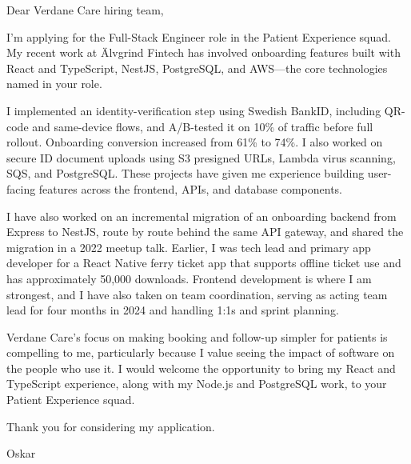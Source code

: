 \documentclass[11pt,a4paper]{article}
\begin{document}
\noindent Dear Verdane Care hiring team,

\vspace{0.8em}

I’m applying for the Full-Stack Engineer role in the Patient Experience squad. My recent work at Älvgrind Fintech has involved onboarding features built with React and TypeScript, NestJS, PostgreSQL, and AWS---the core technologies named in your role.

\vspace{0.8em}

I implemented an identity-verification step using Swedish BankID, including QR-code and same-device flows, and A/B-tested it on 10\% of traffic before full rollout. Onboarding conversion increased from 61\% to 74\%. I also worked on secure ID document uploads using S3 presigned URLs, Lambda virus scanning, SQS, and PostgreSQL. These projects have given me experience building user-facing features across the frontend, APIs, and database components.

\vspace{0.8em}

I have also worked on an incremental migration of an onboarding backend from Express to NestJS, route by route behind the same API gateway, and shared the migration in a 2022 meetup talk. Earlier, I was tech lead and primary app developer for a React Native ferry ticket app that supports offline ticket use and has approximately 50,000 downloads. Frontend development is where I am strongest, and I have also taken on team coordination, serving as acting team lead for four months in 2024 and handling 1:1s and sprint planning.

\vspace{0.8em}

Verdane Care’s focus on making booking and follow-up simpler for patients is compelling to me, particularly because I value seeing the impact of software on the people who use it. I would welcome the opportunity to bring my React and TypeScript experience, along with my Node.js and PostgreSQL work, to your Patient Experience squad.

\vspace{0.8em}

Thank you for considering my application.

\vspace{1em}

Oskar
\end{document}
